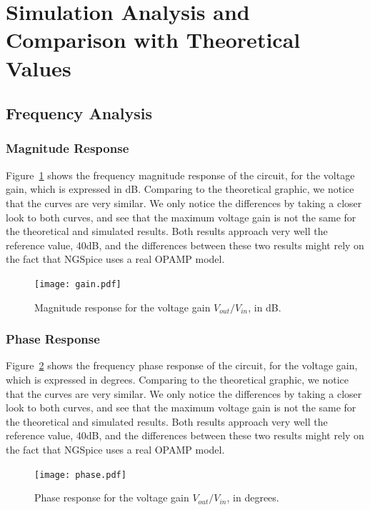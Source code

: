 \section{Simulation Analysis and Comparison with Theoretical Values}
\label{sec:simulation}

\subsection{Frequency Analysis}
\subsubsection{Magnitude Response}

Figure~\ref{fig:gain} shows the frequency magnitude response of the circuit, for the voltage gain, which is expressed in dB. Comparing to the theoretical graphic, we notice that the curves are very similar. We only notice the differences by taking a closer look to both curves, and see that the maximum voltage gain is not the same for the theoretical and simulated results. Both results approach very well the reference value, 40dB, and the differences between these two results might rely on the fact that NGSpice uses a real OPAMP model.

\begin{figure}[H] \centering
\texttt{[image: gain.pdf]}
\caption{Magnitude response for the voltage gain $V_{out}/V_{in}$, in dB.}
\label{fig:gain}
\end{figure}


\subsubsection{Phase Response}


Figure~\ref{fig:phase} shows the frequency phase response of the circuit, for the voltage gain, which is expressed in degrees. Comparing to the theoretical graphic, we notice that the curves are very similar. We only notice the differences by taking a closer look to both curves, and see that the maximum voltage gain is not the same for the theoretical and simulated results. Both results approach very well the reference value, 40dB, and the differences between these two results might rely on the fact that NGSpice uses a real OPAMP model.


\begin{figure}[H] \centering
\texttt{[image: phase.pdf]}
\caption{Phase response for the voltage gain $V_{out}/V_{in}$, in degrees.}
\label{fig:phase}
\end{figure}



